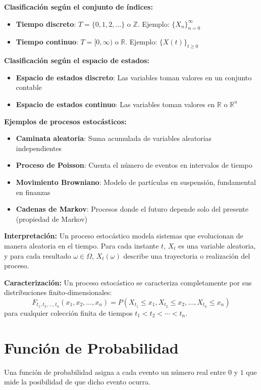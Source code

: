 \documentclass[12pt,a4paper]{article}
\begin{document}
\textbf{Clasificación según el conjunto de índices:}
\begin{itemize}
    \item \textbf{Tiempo discreto}: $T = \{0, 1, 2, \ldots\}$ o $\mathbb{Z}$. Ejemplo: $\{X_n\}_{n=0}^{\infty}$
    \item \textbf{Tiempo continuo}: $T = [0, \infty)$ o $\mathbb{R}$. Ejemplo: $\{X(t)\}_{t \geq 0}$
\end{itemize}

\textbf{Clasificación según el espacio de estados:}
\begin{itemize}
    \item \textbf{Espacio de estados discreto}: Las variables toman valores en un conjunto contable
    \item \textbf{Espacio de estados continuo}: Las variables toman valores en $\mathbb{R}$ o $\mathbb{R}^n$
\end{itemize}

\textbf{Ejemplos de procesos estocásticos:}
\begin{itemize}
    \item \textbf{Caminata aleatoria}: Suma acumulada de variables aleatorias independientes
    \item \textbf{Proceso de Poisson}: Cuenta el número de eventos en intervalos de tiempo
    \item \textbf{Movimiento Browniano}: Modelo de partículas en suspensión, fundamental en finanzas
    \item \textbf{Cadenas de Markov}: Procesos donde el futuro depende solo del presente (propiedad de Markov)
\end{itemize}

\textbf{Interpretación:}
Un proceso estocástico modela sistemas que evolucionan de manera aleatoria en el tiempo. Para cada instante $t$, $X_t$ es una variable aleatoria, y para cada resultado $\omega \in \Omega$, $X_t(\omega)$ describe una trayectoria o realización del proceso.

\textbf{Caracterización:}
Un proceso estocástico se caracteriza completamente por sus distribuciones finito-dimensionales:
\begin{equation}
    F_{t_1, t_2, \ldots, t_n}(x_1, x_2, \ldots, x_n) = P(X_{t_1} \leq x_1, X_{t_2} \leq x_2, \ldots, X_{t_n} \leq x_n)
\end{equation}
para cualquier colección finita de tiempos $t_1 < t_2 < \cdots < t_n$.

\section{Función de Probabilidad}
Una función de probabilidad asigna a cada evento un número real entre $0$ y $1$ que mide la posibilidad de que dicho evento ocurra. 
\end{document}
